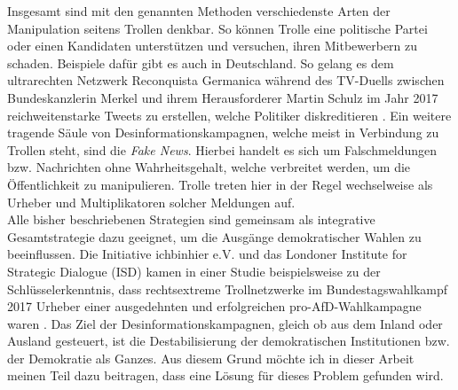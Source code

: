Insgesamt sind mit den genannten Methoden verschiedenste Arten der Manipulation seitens Trollen denkbar. So können Trolle eine politische Partei oder einen Kandidaten unterstützen und versuchen, ihren Mitbewerbern zu schaden. Beispiele dafür gibt es auch in Deutschland.
So gelang es dem ultrarechten Netzwerk \glqq Reconquista Germanica\grqq{} während des TV-Duells zwischen Bundeskanzlerin Merkel und ihrem Herausforderer Martin Schulz im Jahr 2017 reichweitenstarke Tweets zu erstellen, welche Politiker diskreditieren \citep{tagesschau2020}.
Ein weitere tragende Säule von Desinformationskampagnen, welche meist in Verbindung zu Trollen steht, sind die \textit{Fake News}. Hierbei handelt es sich um Falschmeldungen bzw. Nachrichten ohne Wahrheitsgehalt, welche verbreitet werden, um die Öffentlichkeit zu manipulieren. Trolle treten hier in der Regel wechselweise als Urheber und Multiplikatoren solcher Meldungen auf.\\
Alle bisher beschriebenen Strategien sind gemeinsam als integrative Gesamtstrategie dazu geeignet, um die Ausgänge demokratischer Wahlen zu beeinflussen. Die Initiative \glqq ichbinhier e.V.\grqq{} und das Londoner \glqq Institute for Strategic Dialogue\grqq{} (ISD) kamen in einer Studie beispielsweise zu der Schlüsselerkenntnis, dass rechtsextreme Trollnetzwerke im Bundestagswahlkampf 2017 Urheber einer ausgedehnten und erfolgreichen \glqq pro-AfD-Wahlkampagne\grqq{} waren \citep{ISD18}. Das Ziel der Desinformationskampagnen, gleich ob aus dem Inland oder Ausland gesteuert, ist die Destabilisierung der demokratischen Institutionen bzw. der Demokratie als Ganzes. Aus diesem Grund möchte ich in dieser Arbeit meinen Teil dazu beitragen, dass eine Lösung für dieses Problem gefunden wird.  
